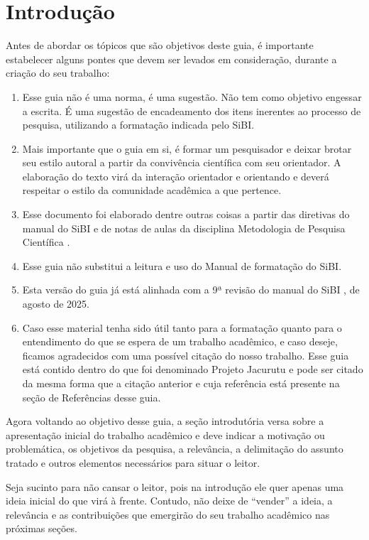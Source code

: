 \chapter{Introdução}

Antes de abordar os tópicos que são objetivos deste guia, é importante estabelecer alguns pontes que devem ser levados em consideração, durante a criação do seu trabalho:

\begin{enumerate}
	\item Esse guia não é uma norma, é uma sugestão. Não tem como objetivo engessar a escrita. É uma sugestão de encadeamento dos itens inerentes ao processo de pesquisa, utilizando a formatação indicada pelo SiBI.
	\item Mais importante que o guia em si, é formar um pesquisador e deixar brotar seu estilo autoral a partir da convivência científica com seu orientador.  A elaboração do texto virá da interação orientador e orientando e deverá respeitar o estilo da comunidade acadêmica a que pertence.
	\item Esse documento foi elaborado dentre outras coisas a partir das diretivas do manual do SiBI  \cite{ManualSibi2025} e de notas de aulas da disciplina Metodologia de Pesquisa Científica \cite{NotasAulas}.
	\item Esse guia não substitui a leitura e uso do Manual de formatação do SiBI.
	\item Esta versão do guia já está alinhada com a 9ª revisão do manual do SiBI \cite{ManualSibi2025}, de agosto de 2025.
	\item Caso esse material tenha sido útil tanto para a formatação quanto para o entendimento do que se espera de um trabalho acadêmico, e caso deseje, ficamos agradecidos com uma possível citação do nosso trabalho. Esse guia está contido dentro do que foi denominado Projeto Jacurutu \cite{Projeto_Jacurutu} e pode ser citado da mesma forma que a citação anterior e  cuja referência está presente na seção de Referências desse guia.
\end{enumerate}

Agora voltando ao objetivo desse guia, a seção introdutória versa sobre a apresentação inicial do trabalho acadêmico e deve indicar a motivação ou problemática, os objetivos da pesquisa, a relevância, a delimitação do assunto tratado e outros elementos necessários para situar o leitor.

Seja sucinto para não cansar o leitor, pois na introdução ele quer apenas uma ideia inicial do que virá à frente. Contudo, não deixe de “vender” a ideia, a relevância e as contribuições que emergirão do seu trabalho acadêmico nas próximas seções.


